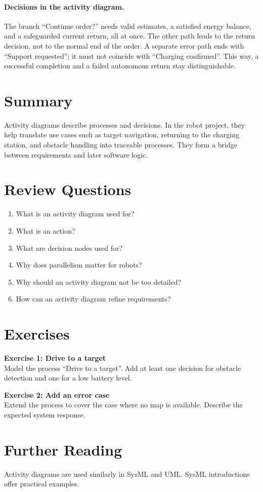 \paragraph{Decisions in the activity diagram.}
The branch \enquote{Continue order?} needs valid estimates, a satisfied energy balance, and a safeguarded current return, all at once. The other path leads to the return decision, not to the normal end of the order. A separate error path ends with \enquote{Support requested}; it must not coincide with \enquote{Charging confirmed}. This way, a successful completion and a failed autonomous return stay distinguishable.

\section{Summary}
Activity diagrams describe processes and decisions. In the robot project, they help translate use cases such as target navigation, returning to the charging station, and obstacle handling into traceable processes. They form a bridge between requirements and later software logic.

\section{Review Questions}
\begin{enumerate}
    \item What is an activity diagram used for?
    \item What is an action?
    \item What are decision nodes used for?
    \item Why does parallelism matter for robots?
    \item Why should an activity diagram not be too detailed?
    \item How can an activity diagram refine requirements?
\end{enumerate}

\section{Exercises}
\begin{uebungbox}
\textbf{Exercise 1: Drive to a target}\\
Model the process \enquote{Drive to a target}. Add at least one decision for obstacle detection and one for a low battery level.
\end{uebungbox}

\begin{uebungbox}
\textbf{Exercise 2: Add an error case}\\
Extend the process to cover the case where no map is available. Describe the expected system response.
\end{uebungbox}

\section{Further Reading}
Activity diagrams are used similarly in SysML and UML. SysML introductions \cite{delligatti2014,friedenthal2014} offer practical examples.
